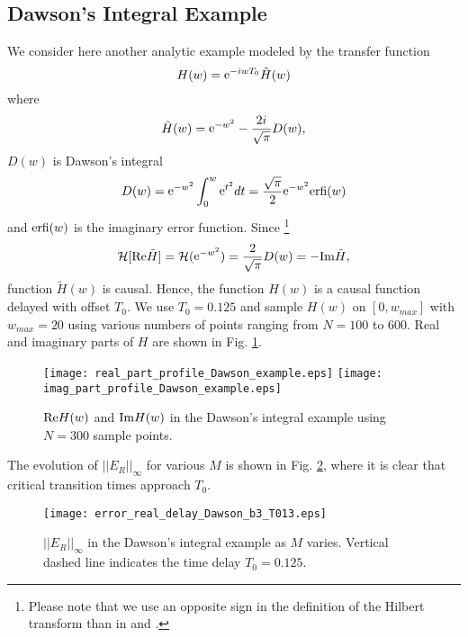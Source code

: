 \documentclass[journal,twoside]{IEEEtran}
\begin{document}
\subsection{Dawson's Integral Example} \label{Dawson_integral_example}

We consider here another analytic example \cite{Knockaert_Dhaene_2008} modeled by the transfer function
\[
H(w)={\mathop{\rm e}\nolimits}^{-iwT_0}\tilde H(w)
\]
where 
\[
\tilde H(w)={\mathop{\rm e}\nolimits}^{-w^2}-\frac{2i}{\sqrt\pi} D(w),
\]
$D(w)$ is Dawson's integral
\[
D(w)={\mathop{\rm e}\nolimits}^{-w^2}\int_0^w {\mathop{\rm e}\nolimits}^{t^2} dt = \frac{\sqrt\pi}{2}{\mathop{\rm e}\nolimits}^{-w^2}{\mathop{\rm erfi}\nolimits}(w)
\]
and ${\mathop{\rm erfi}\nolimits}(w)$ is the imaginary error function.  Since \cite{Weideman_1995}\footnote{Please note that we use an opposite sign in the definition of the Hilbert transform than in \cite{Weideman_1995} and \cite{Knockaert_Dhaene_2008}.}
\[
{\mathcal H}[{\mathop{\rm Re}\nolimits} \tilde H]={\mathcal H}({\mathop{\rm e}\nolimits}^{-w^2})= \frac{2}{\sqrt\pi} D(w)=-{\mathop{\rm Im}\nolimits} \tilde H,
\]
function $\tilde H(w)$ is causal. Hence, the function $H(w)$ is  a causal function delayed with offset $T_0$. We use $T_0=0.125$ and sample $H(w)$ on $[0,w_{max}]$ with $w_{max}=20$ using various numbers of points ranging from $N=100$ to $600$. 
Real and imaginary parts of $H$ are shown in Fig. \ref{FDawson1}.
\begin{figure} \begin{center}
\texttt{[image: real\_part\_profile\_Dawson\_example.eps]}
\hspace{10pt}
\texttt{[image: imag\_part\_profile\_Dawson\_example.eps]}
\end{center}
\caption{${\mathop{\rm Re}\nolimits} H(w)$ and ${\mathop{\rm Im}\nolimits} H(w)$ in the Dawson's integral example  using $N=300$ sample points.}
\label{FDawson1}
\end{figure}
The evolution of $||E_R||_\infty$ for various $M$ is shown in Fig. \ref{FDawson2}, where it is clear that critical transition times approach $T_0$.
\begin{figure} \begin{center}
\texttt{[image: error\_real\_delay\_Dawson\_b3\_T013.eps]}
\end{center}
\caption{$||E_R||_\infty$ in the Dawson's integral example as $M$ varies. Vertical dashed line indicates the time delay $T_0=0.125$.}
\label{FDawson2}
\end{figure}
\end{document}
